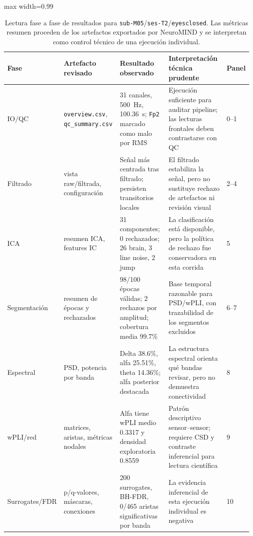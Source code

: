 \begin{fullwidth}
\begin{table}[H]
\centering
\scriptsize
\caption{Lectura fase a fase de resultados para \texttt{sub-M05}/\texttt{ses-T2}/\texttt{eyesclosed}. Las métricas resumen proceden de los artefactos exportados por NeuroMIND y se interpretan como control técnico de una ejecución individual.}
\label{tab:results-phase-dashboard-reading}
\begin{adjustbox}{max width=0.99\fulltextwidth}
\begin{tabular}{@{}p{0.12\fulltextwidth}p{0.22\fulltextwidth}p{0.23\fulltextwidth}p{0.24\fulltextwidth}p{0.12\fulltextwidth}@{}}
\toprule
\textbf{Fase} & \textbf{Artefacto revisado} & \textbf{Resultado observado} & \textbf{Interpretación técnica prudente} & \textbf{Panel} \\
\midrule
IO/QC & \texttt{overview.csv}, \texttt{qc\_summary.csv} & 31 canales, \SI{500}{Hz}, \SI{100.36}{s}; \texttt{Fp2} marcado como malo por RMS & Ejecución suficiente para auditar pipeline; las lecturas frontales deben contrastarse con QC & 0--1 \\
\addlinespace
Filtrado & vista raw/filtrada, configuración & Señal más centrada tras filtrado; persisten transitorios locales & El filtrado estabiliza la señal, pero no sustituye rechazo de artefactos ni revisión visual & 2--4 \\
\addlinespace
ICA & resumen ICA, features IC & 31 componentes; 0 rechazados; 26 brain, 3 line noise, 2 jump & La clasificación está disponible, pero la política de rechazo fue conservadora en esta corrida & 5 \\
\addlinespace
Segmentación & resumen de épocas y rechazados & 98/100 épocas válidas; 2 rechazos por amplitud; cobertura media 99.7\% & Base temporal razonable para PSD/wPLI, con trazabilidad de los segmentos excluidos & 6--7 \\
\addlinespace
Espectral & PSD, potencia por banda & Delta 38.6\%, alfa 25.51\%, theta 14.36\%; alfa posterior destacada & La estructura espectral orienta qué bandas revisar, pero no demuestra conectividad & 8 \\
\addlinespace
wPLI/red & matrices, aristas, métricas nodales & Alfa tiene wPLI medio 0.3317 y densidad exploratoria 0.8559 & Patrón descriptivo sensor--sensor; requiere CSD y contraste inferencial para lectura científica & 9 \\
\addlinespace
Surrogates/FDR & p/q-valores, máscaras, conexiones & 200 surrogates, BH-FDR, 0/465 aristas significativas por banda & La evidencia inferencial de esta ejecución individual es negativa & 10 \\
\bottomrule
\end{tabular}
\end{adjustbox}
\end{table}
\end{fullwidth}

